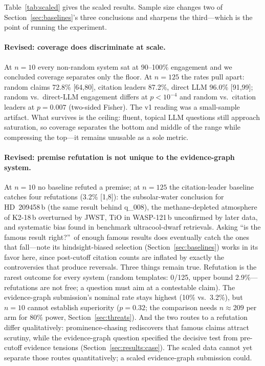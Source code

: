 Table~\ref{tab:scaled} gives the scaled results. Sample size changes
two of Section~\ref{sec:baselines}'s three conclusions and sharpens the
third---which is the point of running the experiment.

\paragraph{Revised: coverage does discriminate at scale.} At $n=10$
every non-random system sat at 90--100\% engagement and we concluded
coverage separates only the floor. At $n=125$ the rates pull apart:
random claims 72.8\% [64,80], citation leaders 87.2\%, direct LLM
96.0\% [91,99]; random vs.\ direct-LLM engagement differs at
$p<10^{-4}$ and random vs.\ citation leaders at $p=0.007$ (two-sided
Fisher). The v1 reading was a small-sample artifact. What survives is
the ceiling: fluent, topical LLM questions still approach saturation,
so coverage separates the bottom and middle of the range while
compressing the top---it remains unusable as a sole metric.

\paragraph{Revised: premise refutation is not unique to the
evidence-graph system.} At $n=10$ no baseline refuted a premise; at
$n=125$ the citation-leader baseline catches four refutations (3.2\%
[1,8]): the subsolar-water conclusion for HD~209458\,b (the same
\citealp{macdonald2017} result behind q\_008), the methane-depleted
atmosphere of K2-18\,b overturned by JWST, TiO in WASP-121\,b
unconfirmed by later data, and systematic bias found in benchmark
ultracool-dwarf retrievals. Asking ``is the famous result right?''\ of
enough famous results does eventually catch the ones that fall---note
its hindsight-biased selection (Section~\ref{sec:baselines}) works in
its favor here, since post-cutoff citation counts are inflated by
exactly the controversies that produce reversals. Three things remain
true. Refutation is the rarest outcome for every system (random
templates: 0/125, upper bound 2.9\%---refutations are not free; a
question must aim at a contestable claim). The evidence-graph
submission's nominal rate stays highest (10\% vs.\ 3.2\%), but $n=10$
cannot establish superiority ($p=0.32$; the comparison needs
$n\approx209$ per arm for 80\% power, Section~\ref{sec:threats}). And the two routes to a
refutation differ qualitatively: prominence-chasing rediscovers that
famous claims attract scrutiny, while the evidence-graph question
specified the decisive test from pre-cutoff evidence tensions
(Section~\ref{sec:results:case}). The scaled data cannot yet separate
those routes quantitatively; a scaled evidence-graph submission could.

